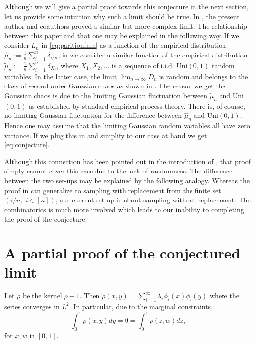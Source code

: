 \documentclass{amsart}
\newcommand{\trho}{\tilde\rho}
\begin{document}
Although we will give a partial proof towards this conjecture in the next section, let us provide some intuition why such a limit should be true. In \cite[Theorem 2]{HLP}, the present author and coauthors proved a similar but more complex limit. The relationship between this paper and that one may be explained in the following way. If we consider $L_n$ in \eqref{eq:paritionfnln} as a function of the empirical distribution $\hat{\mu}_n:=\frac{1}{n} \sum_{i=1}^n \delta_{i/n}$, in \cite{HLP} we consider a similar function of the empirical distribution $\tilde{\mu}_n := \frac{1}{n} \sum_{i=1}^n \delta_{X_i}$, where $X_1, X_2, \ldots$ is a sequence of i.i.d. Uni$(0,1)$ random variables. In the latter case, the limit $\lim_{n\rightarrow\infty} D_n$ is random and belongs to the class of second order Gaussian chaos as shown in \cite[Theorem 2]{HLP}. The reason we get the Gaussian chaos is due to the limiting Gaussian fluctuation between $\tilde{\mu}_n$ and Uni$(0,1)$ as established by standard empirical process theory.  There is, of course, no limiting Gaussian fluctuation for the difference between $\hat{\mu}_n$ and Uni$(0,1)$. Hence one may assume that the limiting Gaussian random variables all have zero variance. If we plug this in \cite[Theorem 2]{HLP} and simplify to our case at hand we get \eqref{eq:conjecture}.

Although this connection has been pointed out in the introduction of \cite{HLP}, that proof simply cannot cover this case due to the lack of randomness. The difference between the two set-ups may be explained by the following analogy. Whereas the proof in \cite{HLP} can generalize to sampling with replacement from the finite set $(i/n,\; i \in [n])$, our current set-up is about sampling without replacement. The combinatorics is much more involved which leads to our inability to completing the proof of the conjecture.  


\section{A partial proof of the conjectured limit} 

Let $\trho$ be the kernel $\rho-1$. Then $\trho(x,y)= \sum_{i=1}^\infty \lambda_i \phi_i(x)\phi_i(y)$ where the series converges in $L^2$. In particular, due to the marginal constraints, 
\begin{equation}\label{eqn:marginal}
    \int_0^1 \tilde{\rho}(x,y)dy=0=\int_0^1 \tilde{\rho}(z,w)dz, 
\end{equation}
for $x,w$ in $[0,1]$. 
\end{document}
